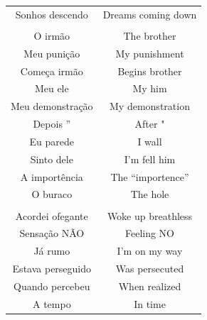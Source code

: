 \documentclass[12pt,fleqn]{article}
\begin{document}
\begin{table}[H]
\begin{tabular}{  c | c }
Sonhos descendo                  &                                                Dreams coming down      \\
  & \\
O irmão                          &                                                The brother             \\
Meu punição                      &                                                My punishment           \\
Começa irmão                     &                                                Begins brother          \\
Meu ele                          &                                                My him                  \\
Meu demonstração                 &                                                My demonstration        \\
Depois ”                         &                                                After "                 \\
Eu parede                        &                                                I wall                  \\
Sinto dele                       &                                                I'm fell him            \\
A importência                    &                                                The ``importence''      \\
O buraco                         &                                                The hole                \\
  & \\
Acordei ofegante                 &                                                Woke up breathless    \\
Sensação NÃO                     &                                                Feeling NO              \\
Já rumo                          &                                                I'm on my way           \\
Estava perseguido                &                                                Was persecuted          \\
Quando percebeu                  &                                                When realized    \\
A tempo                          &                                                In time                 \\

\end{tabular}
\end{table}
\end{document}
